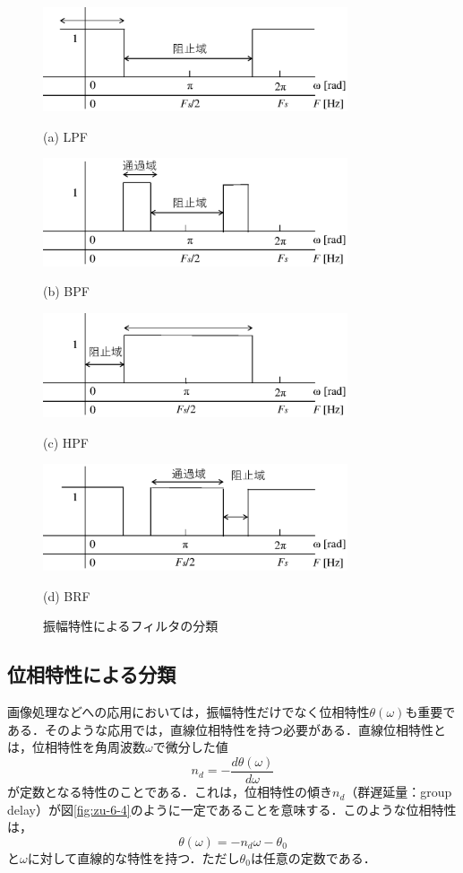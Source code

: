\begin{figure}[H]
\begin{center}
\includegraphics[width=9cm]{fig/zu-6-3-a.eps}

(a) LPF

\includegraphics[width=9cm]{fig/zu-6-3-b.eps}

(b) BPF

\includegraphics[width=9cm]{fig/zu-6-3-c.eps}

(c) HPF

\includegraphics[width=9cm]{fig/zu-6-3-d.eps}

(d) BRF
\end{center}
\caption{振幅特性によるフィルタの分類}
\label{fig:zu-6-3}
\end{figure}


\subsection{位相特性による分類}

画像処理などへの応用においては，振幅特性だけでなく位相特性$\theta(\omega)$も重要である．そのような応用では，直線位相特性を持つ必要がある．直線位相特性とは，位相特性を角周波数$\omega$で微分した値
\begin{equation}
n_d=-\frac{d\theta(\omega)}{d\omega}
\end{equation}
が定数となる特性のことである．これは，位相特性の傾き$n_d$（群遅延量：group delay）が図\ref{fig:zu-6-4}のように一定であることを意味する．このような位相特性は，
\begin{equation}
\theta(\omega)=-n_d\omega-\theta_0
\label{eqn:eqn-6-3}
\end{equation}
と$\omega$に対して直線的な特性を持つ．ただし$\theta_0$は任意の定数である．

